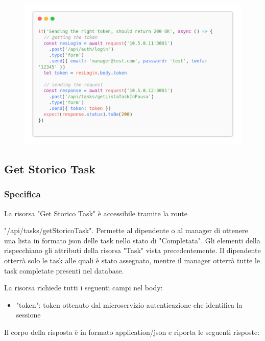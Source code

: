 \documentclass{report}
\begin{document}
\begin{figure}[H]
	\centering\includegraphics[width=1\textwidth]{images/code_in_pausa_test4.png}
\end{figure}


\subsection{Get Storico Task}
\subsubsection*{Specifica}

La risorsa "Get Storico Task" è accessibile tramite la route

"/api/tasks/getStoricoTask". Permette al dipendente o al manager di ottenere una lista in formato json delle task nello stato di "Completata". Gli elementi della rispecchiano gli attributi della risorsa "Task" vista precedentemente.
Il dipendente otterrà solo le task alle quali è stato assegnato, mentre il manager otterrà tutte le task completate presenti nel database.

La risorsa richiede tutti i seguenti campi nel body:
\begin{itemize}
	\item "token": token ottenuto dal microservizio autenticazione che identifica la sessione
\end{itemize}

Il corpo della risposta è in formato application/json e riporta le seguenti risposte:
\end{document}
